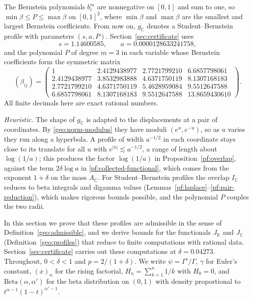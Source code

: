 \documentclass[11pt]{amsart}
\numberwithin{equation}{section}
\theoremstyle{definition}
\theoremstyle{remark}
\newcommand{\R}{\mathbb R}
\newcommand{\C}{\mathbb C}
\newcommand{\deltastar}{0.04273}
\begin{document}
The Bernstein polynomials $b_i^m$ are nonnegative on $[0,1]$ and sum to
one, so $\min\beta\le P\le\max\beta$ on $[0,1]^2$, where $\min\beta$ and
$\max\beta$ are the smallest and largest Bernstein coefficients. From
now on, $g_\C$ denotes a Student--Bernstein profile with parameters
$(s,a,P)$. Section~\ref{sec:certificate} uses
\[
 s=1.14600585,\qquad a=0.0000128633241758,
\]
and the polynomial $P$ of degree $m=3$ in each variable whose Bernstein
coefficients form the symmetric matrix
\begin{equation}\label{pf:bernstein-witness}
 (\beta_{ij})=\begin{pmatrix}
 1&2.4129438977&2.7721799210&6.6857798061\\
 2.4129438977&3.8532983888&4.6371750119&8.1307168183\\
 2.7721799210&4.6371750119&5.4628959084&9.5512647588\\
 6.6857798061&8.1307168183&9.5512647588&13.8659430610
 \end{pmatrix}.
\end{equation}
All finite decimals here are exact rational numbers.

\emph{Heuristic.} The shape of $g_\C$ is adapted to the displacements
at a pair of coordinates. By \eqref{geo:norm-modulus} they have moduli
$(e^u,e^{-u})$, so as $u$ varies they run along a hyperbola. A profile
of width $a^{-1/2}$ in each coordinate stays close to its translate for
all $u$ with $e^{|u|}\lesssim a^{-1/2}$, a range of length about
$\log(1/a)$; this produces the factor $\log(1/a)$ in
Proposition~\ref{pf:overlap}, against the term $2\delta\log a$ in
\eqref{pf:collected-functional}, which comes from the exponent
$1+\delta$ on the mass $A_\C$. For Student--Bernstein profiles the
overlap $I_\C$ reduces to beta integrals and digamma values
(Lemmas~\ref{pf:laplace}--\ref{pf:pair-reduction}), which makes rigorous
bounds possible, and the polynomial $P$ couples the two radii.

In this section we prove that these profiles are admissible in the sense
of Definition~\ref{geo:admissible}, and we derive bounds for the
functionals $J_\R$ and $J_\C$ (Definition~\ref{geo:profiles}) that
reduce to finite computations with rational data. Section~\ref{sec:certificate} carries out these
computations at $\delta=\deltastar$. Throughout, $0<\delta<1$ and
$p=2/(1+\delta)$. We write $\psi=\Gamma'/\Gamma$, $\gamma$ for Euler's
constant, $(x)_n$ for the rising factorial, $H_n=\sum_{k=1}^n1/k$ with
$H_0=0$, and $\mathrm{Beta}(\alpha,\alpha')$ for the beta distribution
on $(0,1)$ with density proportional to $t^{\alpha-1}(1-t)^{\alpha'-1}$.
\end{document}
